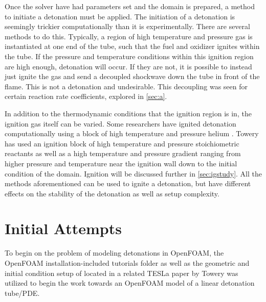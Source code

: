 Once the solver have had parameters set and the domain is prepared, a method to initiate a detonation must be applied. The initiation of a detonation is seemingly trickier computationally than it is experimentally. There are several methods to do this. Typically, a region of high temperature and pressure gas is instantiated at one end of the tube, such that the fuel and oxidizer ignites within the tube. If the pressure and temperature conditions within this ignition region are high enough, detonation will occur. If they are not, it is possible to instead just ignite the gas and send a decoupled shockwave down the tube in front of the flame. This is not a detonation and undesirable. This decoupling was seen for certain reaction rate coefficients, explored in \ref{sec:a}. 

In addition to the thermodynamic conditions that the ignition region is in, the ignition gas itself can be varied. Some researchers have ignited detonation computationally using a block of high temperature and pressure helium \cite{marcantoni}. Towery has used an ignition block of high temperature and pressure stoichiometric reactants \cite{towery1} as well as a high temperature and pressure gradient \cite{towery2} ranging from higher pressure and temperature near the ignition wall down to the initial condition of the domain. Ignition will be discussed further in \ref{sec:igstudy}. All the methods aforementioned can be used to ignite a detonation, but have different effects on the stability of the detonation as well as setup complexity. 





\section{Initial Attempts}
To begin on the problem of modeling detonations in OpenFOAM, the OpenFOAM installation-included tutorials folder as well as the geometric and initial condition setup of located in a related TESLa paper by Towery\cite{towery1} was utilized to begin the work towards an OpenFOAM model of a linear detonation tube/PDE.

